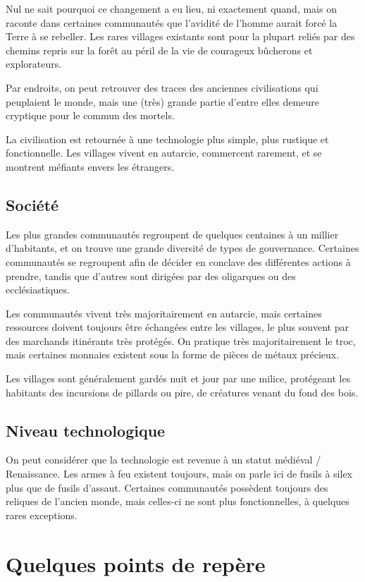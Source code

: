 \documentclass[10pt,twoside,twocolumn,openany,bg=print,justified]{dndbook}
\begin{document}
Nul ne sait pourquoi ce changement a eu lieu, ni exactement quand, mais on raconte dans certaines communautés que l'avidité de l'homme aurait forcé la Terre à se rebeller. Les rares villages existants sont pour la plupart reliés par des chemins repris sur la forêt au péril de la vie de courageux bûcherons et explorateurs.

Par endroits, on peut retrouver des traces des anciennes civilisations qui peuplaient le monde, mais une (très) grande partie d'entre elles demeure cryptique pour le commun des mortels.

La civilisation est retournée à une technologie plus simple, plus rustique et fonctionnelle. Les villages vivent en autarcie, commercent rarement, et se montrent méfiants envers les étrangers.

\subsection*{Société}

Les plus grandes communautés regroupent de quelques centaines à un millier d'habitants, et on trouve une grande diversité de types de gouvernance. Certaines communautés se regroupent afin de décider en conclave des différentes actions à prendre, tandis que d'autres sont dirigées par des oligarques ou des ecclésiastiques.

Les communautés vivent très majoritairement en autarcie, mais certaines ressources doivent toujours être échangées entre les villages, le plus souvent par des marchands itinérants très protégés. On pratique très majoritairement le troc, mais certaines monnaies existent sous la forme de pièces de métaux précieux.

Les villages sont généralement gardés nuit et jour par une milice, protégeant les habitants des incursions de pillards ou pire, de créatures venant du fond des bois.

\subsection*{Niveau technologique}

On peut considérer que la technologie est revenue à un statut médiéval / Renaissance. Les armes à feu existent toujours, mais on parle ici de fusils à silex plus que de fusils d'assaut. Certaines communautés possèdent toujours des reliques de l'ancien monde, mais celles-ci ne sont plus fonctionnelles, à quelques rares exceptions.

\section{Quelques points de repère}
\end{document}
